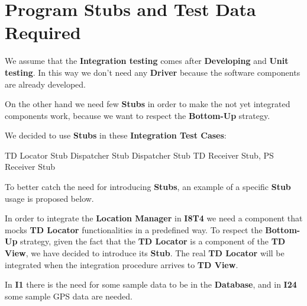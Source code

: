 \section{Program Stubs and Test Data Required}
We assume that the \textbf{Integration testing} comes after \textbf{Developing} and \textbf{Unit testing}. In this way we don't need any \textbf{Driver} because the software components are already developed.\par
On the other hand we need few \textbf{Stubs} in order to make the not yet integrated components work, because we want to respect the \textbf{Bottom-Up} strategy.\par
We decided to use \textbf{Stubs} in these \textbf{Integration Test Cases}:
\begin{itemize}
	 TD Locator Stub
	 Dispatcher Stub
	 Dispatcher Stub
	 TD Receiver Stub, PS Receiver Stub 
\end{itemize}
To better catch the need for introducing \textbf{Stubs}, an example of a specific \textbf{Stub} usage is proposed below.\par
In order to integrate the \textbf{Location Manager} in \textbf{I8T4} we need a component that mocks \textbf{TD Locator} functionalities in a predefined way. 
To respect the \textbf{Bottom-Up} strategy, given the fact that the \textbf{TD Locator} is a component of the \textbf{TD View}, we have decided to introduce its \textbf{Stub}.
The real \textbf{TD Locator} will be integrated when the integration procedure arrives to \textbf{TD View}.\par
In \textbf{I1} there is the need for some sample data to be in the \textbf{Database}, and in \textbf{I24} some sample GPS data are needed.
